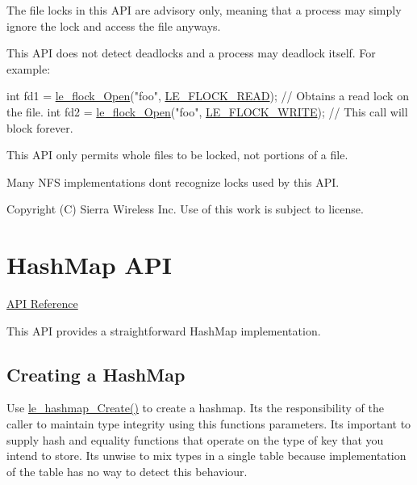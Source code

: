 The file locks in this A\+P\+I are advisory only, meaning that a process may simply ignore the lock and access the file anyways.

This A\+P\+I does not detect deadlocks and a process may deadlock itself. For example\+:


\begin{DoxyCode}
\textcolor{keywordtype}{int} fd1 = \hyperlink{le__file_lock_8h_aac3e11a6f7f363d29b8dbb1eb6c2c287}{le\_flock\_Open}(\textcolor{stringliteral}{"foo"}, \hyperlink{le__file_lock_8h_a5e5400e33a5e10b7c624748a9ce11280a887421ec0def966e3ffc65e6bde1f1fc}{LE\_FLOCK\_READ});   \textcolor{comment}{// Obtains a read lock on the
       file.}
\textcolor{keywordtype}{int} fd2 = \hyperlink{le__file_lock_8h_aac3e11a6f7f363d29b8dbb1eb6c2c287}{le\_flock\_Open}(\textcolor{stringliteral}{"foo"}, \hyperlink{le__file_lock_8h_a5e5400e33a5e10b7c624748a9ce11280a058867728a1de4773023f009c2934188}{LE\_FLOCK\_WRITE});  \textcolor{comment}{// This call will block
       forever.}
\end{DoxyCode}


This A\+P\+I only permits whole files to be locked, not portions of a file.

Many N\+F\+S implementations don\textquotesingle{}t recognize locks used by this A\+P\+I.





Copyright (C) Sierra Wireless Inc. Use of this work is subject to license. \hypertarget{c_hashmap}{}\section{Hash\+Map A\+P\+I}\label{c_hashmap}
\hyperlink{le__hashmap_8h}{A\+P\+I Reference}





This A\+P\+I provides a straightforward Hash\+Map implementation.\hypertarget{c_hashmap_c_hashmap_create}{}\subsection{Creating a Hash\+Map}\label{c_hashmap_c_hashmap_create}
Use {\ttfamily \hyperlink{le__hashmap_8h_ade79896a5b2ceec82c570fe21f7efe3a}{le\+\_\+hashmap\+\_\+\+Create()}} to create a hashmap. It\textquotesingle{}s the responsibility of the caller to maintain type integrity using this function\textquotesingle{}s parameters. It\textquotesingle{}s important to supply hash and equality functions that operate on the type of key that you intend to store. It\textquotesingle{}s unwise to mix types in a single table because implementation of the table has no way to detect this behaviour.

